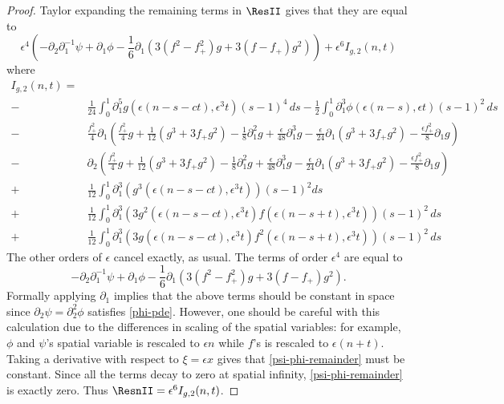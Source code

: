 \documentclass[oneside,reqno]{amsart}
\begin{document}
\begin{proof}
	Taylor expanding the remaining terms in \(\ResII\) gives that they are equal to 
	\begin{equation*}
		\epsilon^4\left(-\partial_2 \partial_1^{-1} \psi+ \partial_1 \phi  - \frac 1 6 \partial_1(3(f^2 - f_+^2) g + 3(f-f_+) g^2)\right) + \epsilon^6 I_{g,2}(n,t)
	\end{equation*}
	where 
	\begin{equation}\label{Ig2}
		\begin{aligned}
			I_{g,2}(n,t) =& \\
			- & \frac{1} {24} \int_{0}^1 \partial_1^5 g(\epsilon(n-s-ct), \epsilon^3 t)  (s-1)^4 \, ds -  \frac{1}2 \int_0^1 \partial_1^3 \phi(\epsilon (n-s), \epsilon t) (s-1)^2\, ds \\
			- & \frac{ f_+^2}{4}\partial_1\left( \frac{f_+^2} 4  g + \frac{1}{12}(g^3 + 3f_+ g^2) -\frac{ 1} 8 \partial_1^2 g  + \frac{\epsilon}{48} \partial_1^3 g - \frac{\epsilon}{24} \partial_1(g^3 + 3f_+ g^2) - \frac{\epsilon f_+^2} 8 \partial_1 g\right) \\
			-&  \partial_2\left( \frac{f_+^2} 4  g + \frac{1}{12}(g^3 + 3f_+ g^2) -\frac{ 1} 8 \partial_1^2 g  + \frac{\epsilon}{48} \partial_1^3 g - \frac{\epsilon}{24} \partial_1(g^3 + 3f_+ g^2) - \frac{\epsilon f_+^2} 8 \partial_1 g\right) \\
			+ & \frac{1} {12} \int_0^1 \partial_1^3(g^3(\epsilon(n-s-ct), \epsilon^3 t)) (s-1)^2 ds  \\
			+ & \frac{1} {12} \int_0^1 \partial_1^3( 3g^2(\epsilon(n-s-ct), \epsilon^3 t)f(\epsilon(n-s+t), \epsilon^3 t)) (s-1)^2\, ds \\
			+ & \frac{1} {12} \int_0^1 \partial_1^3 (3g(\epsilon(n-s-ct), \epsilon^3 t)f^2(\epsilon(n-s+t), \epsilon^3 t)) (s-1)^2 \, ds
		\end{aligned}
	\end{equation}
	The other orders of \(\epsilon\) cancel exactly, as usual. The terms of order \(\epsilon^4\) are equal to 
	\begin{equation}\label{psi-phi-remainder}
		-\partial_2 \partial_1^{-1} \psi+ \partial_1 \phi  - \frac 1 6 \partial_1(3(f^2 - f_+^2) g + 3(f-f_+) g^2).
	\end{equation}
	Formally applying \(\partial_1\) implies that the above terms should be constant in space since \(\partial_2 \psi = \partial_2^2 \phi\) satisfies \cref{phi-pde}. However, one should be careful with this calculation due to the differences in scaling of the spatial variables: for example, \(\phi\) and \(\psi\)'s spatial variable is rescaled to \(\epsilon n\) while \(f\)'s is rescaled to \(\epsilon(n+t)\). Taking a derivative with respect to \(\xi = \epsilon x\) gives that \cref{psi-phi-remainder} must be constant. Since all the terms decay to zero at spatial infinity, \cref{psi-phi-remainder} is exactly zero. Thus \(\ResnII= \epsilon^6 I_{g,2}(n,t)\).
	

\end{proof}
\end{document}
